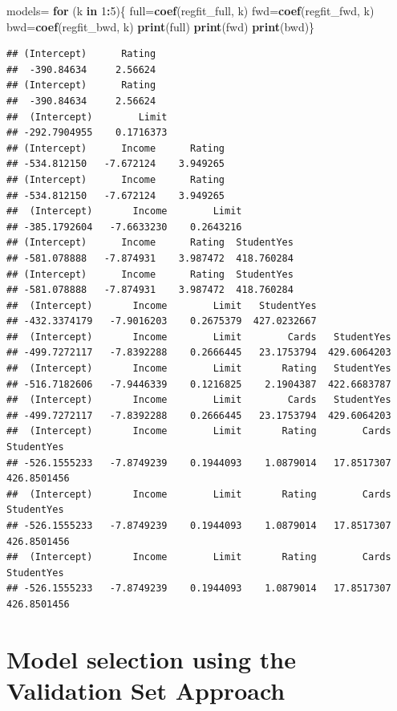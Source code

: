 \documentclass[
]{article}
\newenvironment{Shaded}{\begin{snugshade}}{\end{snugshade}}
\newcommand{\ControlFlowTok}[1]{\textcolor[rgb]{0.13,0.29,0.53}{\textbf{#1}}}
\newcommand{\DecValTok}[1]{\textcolor[rgb]{0.00,0.00,0.81}{#1}}
\newcommand{\KeywordTok}[1]{\textcolor[rgb]{0.13,0.29,0.53}{\textbf{#1}}}
\newcommand{\NormalTok}[1]{#1}
\newcommand{\OperatorTok}[1]{\textcolor[rgb]{0.81,0.36,0.00}{\textbf{#1}}}
\begin{document}
\begin{Shaded}
\begin{Highlighting}[]
\NormalTok{models=}
\ControlFlowTok{for}\NormalTok{ (k }\ControlFlowTok{in} \DecValTok{1}\OperatorTok{:}\DecValTok{5}\NormalTok{)\{}
\NormalTok{full=}\KeywordTok{coef}\NormalTok{(regfit_full, k)}
\NormalTok{fwd=}\KeywordTok{coef}\NormalTok{(regfit_fwd, k)}
\NormalTok{bwd=}\KeywordTok{coef}\NormalTok{(regfit_bwd, k)}
\KeywordTok{print}\NormalTok{(full)}
\KeywordTok{print}\NormalTok{(fwd)}
\KeywordTok{print}\NormalTok{(bwd)\}}
\end{Highlighting}
\end{Shaded}

\begin{verbatim}
## (Intercept)      Rating 
##  -390.84634     2.56624 
## (Intercept)      Rating 
##  -390.84634     2.56624 
##  (Intercept)        Limit 
## -292.7904955    0.1716373 
## (Intercept)      Income      Rating 
## -534.812150   -7.672124    3.949265 
## (Intercept)      Income      Rating 
## -534.812150   -7.672124    3.949265 
##  (Intercept)       Income        Limit 
## -385.1792604   -7.6633230    0.2643216 
## (Intercept)      Income      Rating  StudentYes 
## -581.078888   -7.874931    3.987472  418.760284 
## (Intercept)      Income      Rating  StudentYes 
## -581.078888   -7.874931    3.987472  418.760284 
##  (Intercept)       Income        Limit   StudentYes 
## -432.3374179   -7.9016203    0.2675379  427.0232667 
##  (Intercept)       Income        Limit        Cards   StudentYes 
## -499.7272117   -7.8392288    0.2666445   23.1753794  429.6064203 
##  (Intercept)       Income        Limit       Rating   StudentYes 
## -516.7182606   -7.9446339    0.1216825    2.1904387  422.6683787 
##  (Intercept)       Income        Limit        Cards   StudentYes 
## -499.7272117   -7.8392288    0.2666445   23.1753794  429.6064203 
##  (Intercept)       Income        Limit       Rating        Cards   StudentYes 
## -526.1555233   -7.8749239    0.1944093    1.0879014   17.8517307  426.8501456 
##  (Intercept)       Income        Limit       Rating        Cards   StudentYes 
## -526.1555233   -7.8749239    0.1944093    1.0879014   17.8517307  426.8501456 
##  (Intercept)       Income        Limit       Rating        Cards   StudentYes 
## -526.1555233   -7.8749239    0.1944093    1.0879014   17.8517307  426.8501456
\end{verbatim}

\hypertarget{model-selection-using-the-validation-set-approach}{%
\section{Model selection using the Validation Set
Approach}\label{model-selection-using-the-validation-set-approach}}
\end{document}
